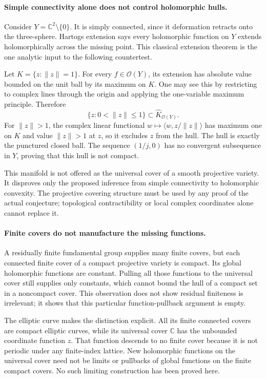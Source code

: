 \documentclass[11pt]{article}
\begin{document}
\paragraph{Simple connectivity alone does not control holomorphic hulls.}
Consider $Y=\mathbb C^2\setminus\{0\}$. It is simply connected,
since it deformation retracts onto the three-sphere. Hartogs extension
says every holomorphic function on $Y$ extends holomorphically across
the missing point. This classical extension theorem is the one
analytic input to the following countertest.

Let $K=\{z:\|z\|=1\}$. For every $f\in\mathcal O(Y)$, its extension
has absolute value bounded on the unit ball by its maximum on $K$.
One may see this by restricting to complex lines through the origin
and applying the one-variable maximum principle. Therefore
\[
          \{z:0<\|z\|\le1\}\subset\widehat K_{\mathcal O(Y)}.
\]
For $\|z\|>1$, the complex linear functional
$w\mapsto\langle w,z/\|z\|\rangle$ has maximum one on $K$ and
value $\|z\|>1$ at $z$, so it excludes $z$ from the hull. The hull
is exactly the punctured closed ball. The sequence $(1/j,0)$ has no
convergent subsequence in $Y$, proving that this hull is not compact.

This manifold is not offered as the universal cover of a smooth
projective variety. It disproves only the proposed inference from
simple connectivity to holomorphic convexity. The projective covering
structure must be used by any proof of the actual conjecture; topological
contractibility or local complex coordinates alone cannot replace it.

\paragraph{Finite covers do not manufacture the missing functions.}
A residually finite fundamental group supplies many finite covers,
but each connected finite cover of a compact projective variety is
compact. Its global holomorphic functions are constant. Pulling all
those functions to the universal cover still supplies only constants,
which cannot bound the hull of a compact set in a noncompact cover.
This observation does not show residual finiteness is irrelevant; it
shows that this particular function-pullback argument is empty.

The elliptic curve makes the distinction explicit. All its finite
connected covers are compact elliptic curves, while its universal
cover $\mathbb C$ has the unbounded coordinate function $z$. That
function descends to no finite cover because it is not periodic under
any finite-index lattice. New holomorphic functions on the universal
cover need not be limits or pullbacks of global functions on the finite
compact covers. No such limiting construction has been proved here.
\end{document}
